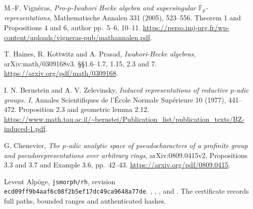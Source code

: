 M.-F. Vign\'eras, \emph{Pro-\(p\)-Iwahori Hecke algebra and
supersingular \(\overline{\mathbb F}_p\)-representations},
Mathematische Annalen 331 (2005), 523--556.
Theorem 1 and Propositions 4 and 6, author pp.~5--6, 10--11.
\url{https://perso.imj-prg.fr/wp-content/uploads/vigneras-pub/mathannalen.pdf}.

T. Haines, R. Kottwitz and A. Prasad,
\emph{Iwahori-Hecke algebras}, arXiv:math/0309168v3.
\S\S1.6--1.7, 1.15, 2.3 and 7.
\url{https://arxiv.org/pdf/math/0309168}.

I. N. Bernstein and A. V. Zelevinsky,
\emph{Induced representations of reductive \(p\)-adic groups. I},
Annales Scientifiques de l'\'Ecole Normale Sup\'erieure 10 (1977),
441--472. Proposition 2.3 and geometric lemma 2.12.
\url{https://www.math.tau.ac.il/~bernstei/Publication_list/publication_texts/BZ-induced-1.pdf}.

G. Chenevier, \emph{The \(p\)-adic analytic space of pseudocharacters
of a profinite group and pseudorepresentations over arbitrary rings},
arXiv:0809.0415v2, Propositions 3.3 and 3.7 and Example 3.6,
pp.~42--43.
\url{https://arxiv.org/pdf/0809.0415}.

{\raggedright
Levent Alp\"oge, \texttt{jsmorph/rh},
revision \texttt{ecd09ff9b4aaf6c08f2b5ef17dc49ca9648a77de}.
,
,
,
and .
The  certificate
records full paths, bounded ranges and authenticated hashes.
\par}
